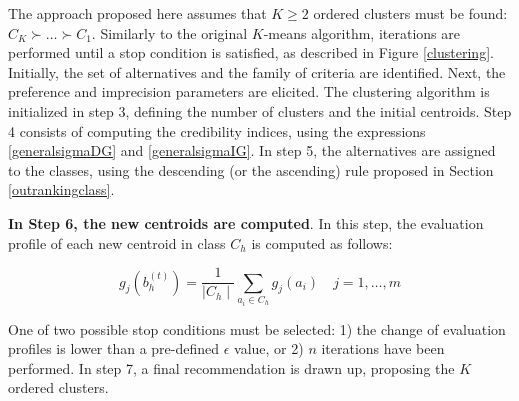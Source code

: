 \documentclass[]{elsarticle}
\theoremstyle{definition}
\begin{document}
The approach proposed here assumes that $K\geq 2$ ordered clusters must be found: $C_K \succ \ldots \succ C_1$. Similarly to the original $K$-means algorithm, iterations are performed until a stop condition is satisfied, as described  in Figure \ref{clustering}.  Initially, the set of alternatives and the family of criteria are identified.  Next, the preference and imprecision parameters are elicited.  The clustering algorithm is initialized in step 3, defining the number of clusters and  the initial centroids. Step 4 consists of computing the credibility indices, using the expressions \eqref{generalsigmaDG} and  \eqref{generalsigmaIG}. In step 5, the alternatives are assigned to the classes, using the descending (or the ascending) rule proposed in Section \ref{outrankingclass}.

{\bf In Step 6, the new centroids are computed}.   In this step, the evaluation profile of each new centroid in class $C_h$ is computed as follows:

\begin{equation}
g_j(b_h^{(t)}) = \frac{1}{\mid C_h \mid} \sum_{a_i \in C_h} g_j(a_i) \quad j=1,\ldots,m \label{newcentroid}
\end{equation}

One of two possible stop conditions must be selected: 1) the change of evaluation profiles is  lower than a pre-defined $\epsilon$ value, or 2) $n$ iterations have been performed.  In step 7, a final recommendation is drawn up, proposing the $K$ ordered clusters.
\end{document}
